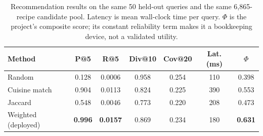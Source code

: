 \begin{table}[t]
\caption{Recommendation results on the same 50 held-out queries and the same
6{,}865-recipe candidate pool. Latency is mean wall-clock time per query.
$\Phi$ is the project's composite score; its constant reliability term makes it a
bookkeeping device, not a validated utility.}
\label{tab:results}
\centering
\scriptsize
\setlength{\tabcolsep}{3.4pt}
\begin{tabular}{@{}lcccccc@{}}
\toprule
\textbf{Method} & \textbf{P@5} & \textbf{R@5} & \textbf{Div@10} & \textbf{Cov@20} & \textbf{Lat. (ms)} & \textbf{$\Phi$} \\
\midrule
Random            & 0.128 & 0.0006 & 0.958 & 0.254 & 110 & 0.398 \\
Cuisine match     & 0.904 & 0.0113 & 0.824 & 0.225 & 390 & 0.553 \\
Jaccard           & 0.548 & 0.0046 & 0.773 & 0.220 & 208 & 0.473 \\
Weighted (deployed) & \textbf{0.996} & \textbf{0.0157} & 0.869 & 0.234 & 180 & \textbf{0.631} \\
\bottomrule
\end{tabular}
\end{table}
